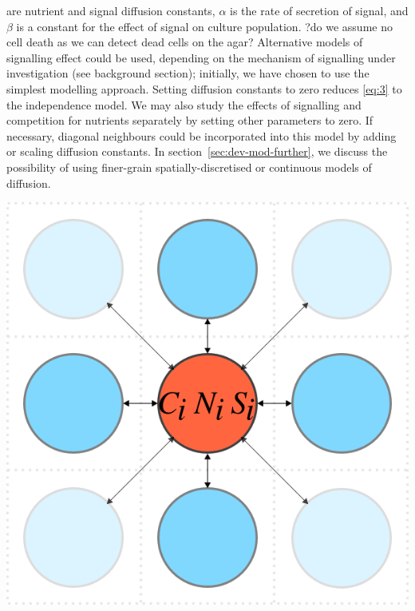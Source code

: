 are nutrient and signal diffusion constants, \(\alpha\) is the rate of
secretion of signal, and \(\beta\) is a constant for the effect of
signal on culture population. ?do we assume no cell death as we can
detect dead cells on the agar? Alternative models of signalling effect
could be used, depending on the mechanism of signalling under
investigation (see background section); initially, we have chosen to
use the simplest modelling approach. Setting diffusion constants to
zero reduces \ref{eq:3} to the independence model. We may also study
the effects of signalling and competition for nutrients separately by
setting other parameters to zero. If necessary, diagonal neighbours
could be incorporated into this model by adding or scaling diffusion
constants. In section~\ref{sec:dev-mod-further}, we discuss the
possibility of using finer-grain spatially-discretised or continuous
models of diffusion.

\begin{Figure}
  \centering
  \includegraphics[width=\linewidth]{square_array}
  \label{fig:simple_model}
\end{Figure}

